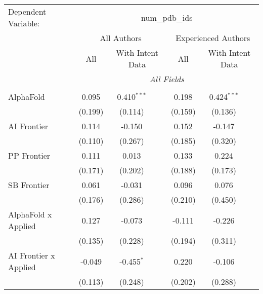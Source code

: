 \begingroup
\centering
\begin{tabular}{lcccccc}
   \tabularnewline \midrule \midrule
   Dependent Variable: & \multicolumn{6}{c}{num\_pdb\_ids}\\
 & \multicolumn{3}{c}{All Authors} & \multicolumn{3}{c}{Experienced Authors} \\
\cmidrule(lr){2-4} \cmidrule(lr){5-7}
 & \multicolumn{1}{c}{All} & \multicolumn{2}{c}{With Intent Data} & \multicolumn{1}{c}{All} & \multicolumn{2}{c}{With Intent Data} \\
\cmidrule(lr){2-2} \cmidrule(lr){3-4} \cmidrule(lr){5-5} \cmidrule(lr){6-7}
 & \multicolumn{6}{c}{\textit{All Fields}} \\ \\
   AlphaFold                      & 0.095         & 0.410$^{***}$ &               & 0.198         & 0.424$^{***}$ &   \\   
                                  & (0.199)       & (0.114)       &               & (0.159)       & (0.136)       &   \\   
   AI Frontier                    & 0.114         & -0.150        &               & 0.152         & -0.147        &   \\   
                                  & (0.110)       & (0.267)       &               & (0.185)       & (0.320)       &   \\   
   PP Frontier                    & 0.111         & 0.013         &               & 0.133         & 0.224         &   \\   
                                  & (0.171)       & (0.202)       &               & (0.188)       & (0.173)       &   \\   
   SB Frontier                    & 0.061         & -0.031        &               & 0.096         & 0.076         &   \\   
                                  & (0.176)       & (0.286)       &               & (0.210)       & (0.450)       &   \\   
   AlphaFold x Applied            & 0.127         & -0.073        &               & -0.111        & -0.226        &   \\   
                                  & (0.135)       & (0.228)       &               & (0.194)       & (0.311)       &   \\   
   AI Frontier x Applied          & -0.049        & -0.455$^{*}$  &               & 0.220         & -0.106        &   \\   
                                  & (0.113)       & (0.248)       &               & (0.202)       & (0.288)       &   \\   

\end{tabular}
